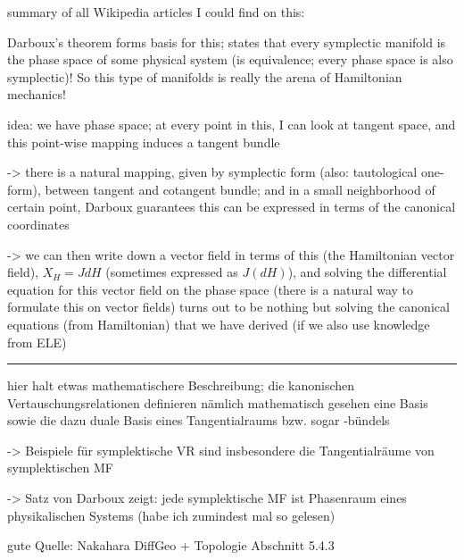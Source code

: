 \documentclass[../class_mech_main.tex]{subfiles}
\begin{document}
summary of all Wikipedia articles I could find on this:

Darboux's theorem forms basis for this; states that every symplectic manifold is the phase space of some physical system (is equivalence; every phase space is also symplectic)! So this type of manifolds is really the arena of Hamiltonian mechanics!


idea: we have phase space; at every point in this, I can look at tangent space, and this point-wise mapping induces a tangent bundle

-> there is a natural mapping, given by symplectic form (also: tautological one-form), between tangent and cotangent bundle; and in a small neighborhood of certain point, Darboux guarantees this can be expressed in terms of the canonical coordinates

-> we can then write down a vector field in terms of this (the Hamiltonian vector field), $X_H = J dH$ (sometimes expressed as $J(dH)$), and solving the differential equation for this vector field on the phase space (there is a natural way to formulate this on vector fields) turns out to be nothing but solving the canonical equations (from Hamiltonian) that we have derived (if we also use knowledge from ELE)



\hrule


hier halt etwas mathematischere Beschreibung; die kanonischen Vertauschungsrelationen definieren nämlich mathematisch gesehen eine Basis sowie die dazu duale Basis eines Tangentialraums bzw. sogar -bündels

-> Beispiele für symplektische VR sind insbesondere die Tangentialräume von symplektischen MF

-> Satz von Darboux zeigt: jede symplektische MF ist Phasenraum eines physikalischen Systems (habe ich zumindest mal so gelesen)


gute Quelle: Nakahara DiffGeo + Topologie Abschnitt 5.4.3
\end{document}
